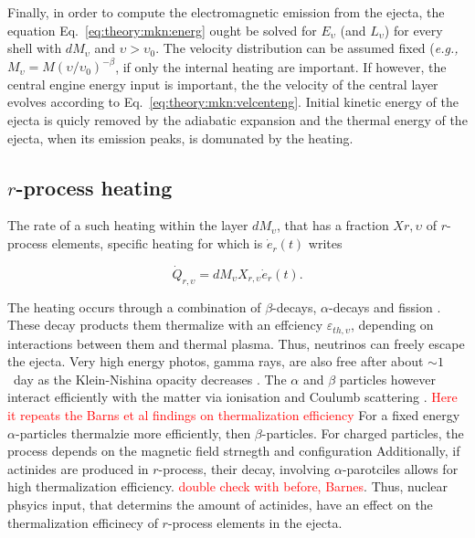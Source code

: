 \documentclass[11pt,a4paper,headinclude=true,DIV=14,BCOR=8mm,chapterprefix,listof=totoc,twoside,openright,abstracton]{scrbook}
\newcommand{\red}[1]{\textcolor{red}{#1}}
\begin{document}
Finally, in order to compute the electromagnetic emission from the ejecta, the equation Eq.~\eqref{eq:theory:mkn:energ} ought be solved for $E_{\upsilon}$ (and $L_{\upsilon}$) for every shell with $dM_{\upsilon}$ and $\upsilon>\upsilon_0$. 
The velocity distribution can be assumed fixed (\textit{e.g.,} $M_{\upsilon} = M(\upsilon/\upsilon_0)^{-\beta}$,  if only the internal heating are important. If however, the central engine energy input is important, the the velocity of the central layer evolves according to Eq.~\eqref{eq:theory:mkn:velcenteng}.
Initial kinetic energy of the ejecta is quicly removed by the adiabatic expansion and the thermal energy of the ejecta, when its emission peaks, is domunated by the heating.


\subsection{$r$-process heating}

The rate of a such heating within the layer $dM_{\upsilon}$, that has a fraction $X{r,\upsilon}$ of $r$-process elements, specific heating for which is $\dot{e}_r(t)$ writes

\begin{equation}
    \dot{Q}_{r,\upsilon} = dM_{\upsilon}X_{r,\upsilon}\dot{e}_{r}(t).
\end{equation}

The heating occurs through a combination of $\beta$-decays, $\alpha$-decays and fission \cite{(Metzger et al 2010b; Barnes et al 2016; Hotokezaka et al 2016)}. These decay products them thermalize with an effciency $\varepsilon_{th,\upsilon}$, depending on interactions between them and thermal plasma.
Thus, neutrinos can freely escape the ejecta. Very high energy photos, gamma rays, are also free after about $\sim 1$~day as the Klein-Nishina opacity decreases \cite{(Fig. 4; Hotokezaka et al 2016; Barnes et al 2016)}.
The $\alpha$ and $\beta$ particles however interact efficiently with the matter via ionisation \cite{(Barnes et al 2016)} and Coulumb scattering \cite{(Metzger et al 2010b)}.
\red{Here it repeats the Barns et al findings on thermalization efficiency}
For a fixed energy $\alpha$-particles thermalzie more efficiently, then $\beta$-particles.
For charged particles, the process depends on the magnetic field strnegth and configuration \cite{Barnes et al (2016)}
Additionally, if actinides are produced in $r$-process, their decay, involving $\alpha$-parotciles allows for high thermalization efficiency. \red{double check with before, Barnes}. Thus, nuclear phsyics input, that determins the amount of actinides, have an effect on the thermalization efficinecy of $r$-process elements in the ejecta.
\end{document}
